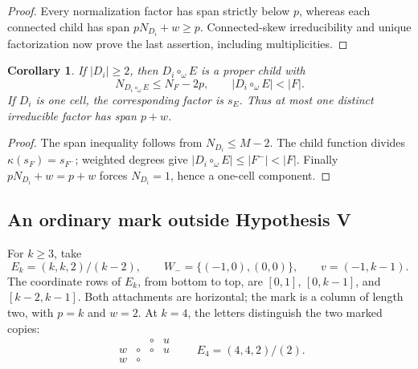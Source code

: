 \documentclass[11pt,a4paper]{amsart}
\numberwithin{equation}{section}
\theoremstyle{plain}
\newtheorem{corollary}[theorem]{Corollary}
\theoremstyle{definition}
\begin{document}
\begin{proof}
Every normalization factor has span strictly below \(p\), whereas each connected child has span \(pN_{D_i}+w\ge p\).  Connected-skew irreducibility and unique factorization now prove the last assertion, including multiplicities.
\end{proof}

\begin{corollary}\label{cor:proper-child}
If \(|D_i|\ge2\), then \(D_i\circ_\omega E\) is a proper child with
\begin{equation}\label{eq:child-descent}
 N_{D_i\circ_\omega E}\le N_F-2p,
 \qquad |D_i\circ_\omega E|<|F|.
\end{equation}
If \(D_i\) is one cell, the corresponding factor is \(s_E\).  Thus at most one distinct irreducible factor has span \(p+w\).
\end{corollary}
\begin{proof}
The span inequality follows from \(N_{D_i}\le M-2\).  The child function divides \(\kappa(s_F)=s_{F^-}\); weighted degrees give \(|D_i\circ_\omega E|\le |F^-|<|F|\).  Finally \(pN_{D_i}+w=p+w\) forces \(N_{D_i}=1\), hence a one-cell component.
\end{proof}

\subsection{An ordinary mark outside Hypothesis V}

For \(k\ge3\), take
\begin{equation}\label{eq:non-v-family}
 E_k=(k,k,2)/(k-2),\qquad
 W_- = \{(-1,0),(0,0)\},\qquad v=(-1,k-1).
\end{equation}
The coordinate rows of \(E_k\), from bottom to top, are
\([0,1]\), \([0,k-1]\), and \([k-2,k-1]\).  Both attachments are horizontal; the mark is a column of length two, with \(p=k\) and \(w=2\).  At \(k=4\), the letters distinguish the two marked copies:
\begin{equation*}
 \begin{array}{cccc}
 &&\circ&u\\
 w&\circ&\circ&u\\
 w&\circ&&
 \end{array}
 \qquad E_4=(4,4,2)/(2).
\end{equation*}
\end{document}
